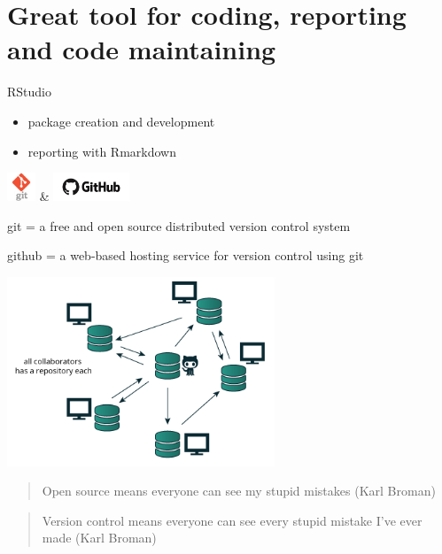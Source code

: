 \documentclass[8pt,ignorenonframetext,]{beamer}
\providecommand{\tightlist}{%
  \setlength{\itemsep}{0pt}\setlength{\parskip}{0pt}}
\begin{document}
\section{Great tool for coding, reporting and code
maintaining}\label{great-tool-for-coding-reporting-and-code-maintaining}

\begin{frame}{RStudio}

\begin{itemize}
\tightlist
\item
  package creation and development
\item
  reporting with Rmarkdown
\end{itemize}

\end{frame}

\begin{frame}{\includegraphics[height=0.33333in]{imgPres/input/git-logo.png}
\& \includegraphics[height=0.33333in]{imgPres/input/github-logo.png}}

git = a free and open source distributed version control system

github = a web-based hosting service for version control using git

\includegraphics[width=0.60000\textwidth]{imgPres/input/distributed-vc.png}

\begin{quote}
Open source means everyone can see my stupid mistakes (Karl Broman)
\end{quote}

\begin{quote}
Version control means everyone can see every stupid mistake I've ever
made (Karl Broman)
\end{quote}

\end{frame}
\end{document}
